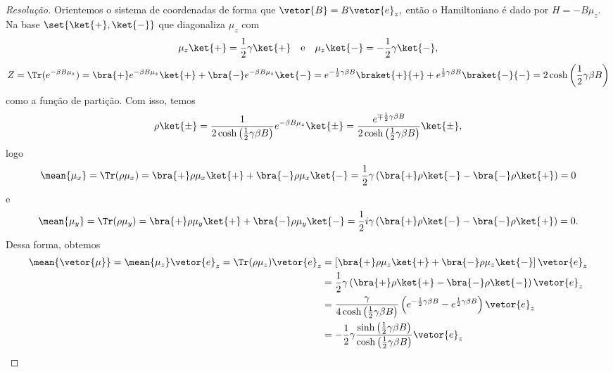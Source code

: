 \begin{proof}[Resolução]
   Orientemos o sistema de coordenadas de forma que \(\vetor{B} = B \vetor{e}_z,\) então o Hamiltoniano é dado por \(H = - B \mu_z\). Na base \(\set{\ket{+}, \ket{-}}\) que diagonaliza \(\mu_z\) com
   \begin{equation*}
      \mu_z \ket{+} = \frac12\gamma \ket{+}
      \quad\text{e}\quad
      \mu_z \ket{-} = -\frac12\gamma \ket{-},
   \end{equation*}
   \begin{equation*}
      Z = \Tr(e^{-\beta B \mu_z}) = \bra{+}e^{-\beta B \mu_z}\ket{+} + \bra{-}e^{-\beta B \mu_z}\ket{-} = e^{-\frac12 \gamma \beta B}\braket{+}{+}  + e^{\frac12 \gamma \beta B} \braket{-}{-} = 2 \cosh\left(\frac12 \gamma \beta B\right)
   \end{equation*}
   como a função de partição. Com isso, temos
   \begin{equation*}
      \rho \ket{\pm} = \frac1{2 \cosh\left(\frac12 \gamma \beta B\right)} e^{- \beta B \mu_z} \ket{\pm} = \frac{e^{\mp \frac12 \gamma \beta B}}{2\cosh\left(\frac12 \gamma \beta B\right)}\ket{\pm},
   \end{equation*}
   logo
   \begin{equation*}
      \mean{\mu_x} = \Tr(\rho \mu_x) = \bra{+} \rho \mu_x \ket{+} + \bra{-} \rho \mu_x \ket{-} = \frac12 \gamma \left(\bra{+} \rho \ket{-} - \bra{-} \rho \ket{+}\right) = 0
   \end{equation*}
   e
   \begin{equation*}
      \mean{\mu_y} = \Tr(\rho \mu_y) = \bra{+} \rho \mu_y \ket{+} + \bra{-} \rho \mu_y \ket{-} = \frac12 i\gamma \left(\bra{+} \rho \ket{-} - \bra{-} \rho \ket{+}\right) = 0.
   \end{equation*}
   Dessa forma, obtemos
   \begin{align*}
      \mean{\vetor{\mu}} = \mean{\mu_z}\vetor{e}_z = \Tr(\rho \mu_z)\vetor{e}_z 
      &= \left[\bra{+} \rho \mu_z \ket{+} + \bra{-} \rho \mu_z \ket{-}\right]\vetor{e}_z\\
      &= \frac12 \gamma \left(\bra{+} \rho \ket{+} - \bra{-} \rho \ket{-}\right)\vetor{e}_z\\
      &= \frac\gamma{4\cosh\left(\frac12 \gamma \beta B\right)} \left(e^{-\frac12 \gamma \beta B} - e^{\frac12 \gamma \beta B}\right)\vetor{e}_z\\
      &= - \frac12\gamma \frac{\sinh\left(\frac12 \gamma \beta B\right)}{\cosh\left(\frac12 \gamma \beta B\right)}\vetor{e}_z\\

\end{align*}
\end{proof}
